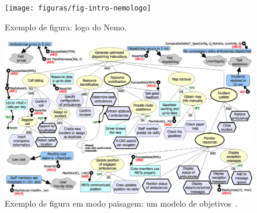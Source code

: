 \begin{figure}
\centering
\texttt{[image: figuras/fig-intro-nemologo]} 
\caption{Exemplo de figura: logo do Nemo.}
\label{fig-intro-nemologo}
\end{figure}

\begin{figure}
\centering
\includegraphics[width=\textwidth]{figuras/fig-intro-exemplosideways} 
\caption{Exemplo de figura em modo paisagem: um modelo de objetivos~\cite{souza-mylopoulos:spe13}.}
\label{fig-intro-exemplosideways}
\end{figure}